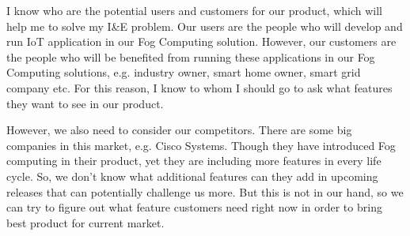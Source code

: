 I know who are the potential users and customers for our product, which will help me to solve my I\&E problem. Our users are the people who will develop and run \ac{IoT} application in our Fog Computing solution. However, our customers are the people who will be benefited from running these applications in our Fog Computing solutions, e.g. industry owner, smart home owner, smart grid company etc. 
For this reason, I know to whom I should go to ask what features they want to see in our product. 



However, we also need to consider our competitors. There are some big companies in this market, e.g. Cisco Systems. Though they have introduced Fog computing in their product, yet they are including more features in every life cycle. So, we don't know what additional features can they add in upcoming releases that can potentially challenge us more. But this is not in our hand, so we can try to figure out what feature customers need right now in order to bring best product for current market.


